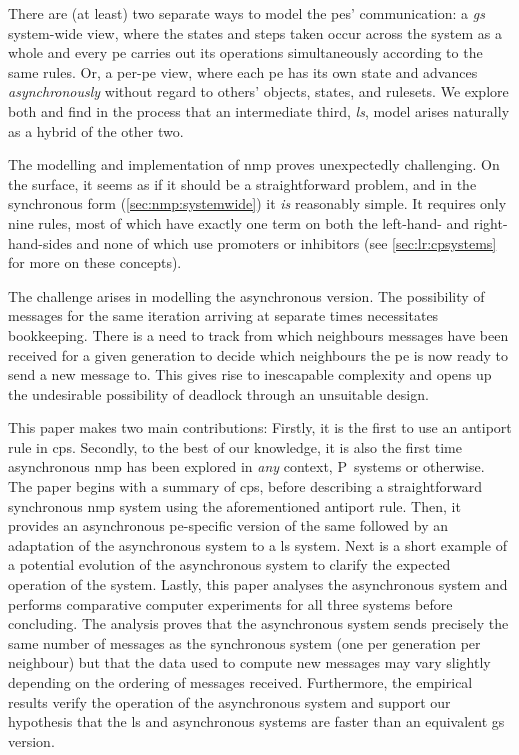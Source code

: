 There are (at least) two separate ways to model the \glspl{pe}' communication:  a \emph{\gls{gs}} system-wide view, where the states and steps taken occur across the system as a whole and every \gls{pe} carries out its operations simultaneously according to the same rules.  Or, a per-\gls{pe} view, where each \gls{pe} has its own state and advances \emph{asynchronously} without regard to others' objects, states, and rulesets.  We explore both and find in the process that an intermediate third, \emph{\gls{ls}}, model arises naturally as a hybrid of the other two.

The modelling and implementation of \gls{nmp} proves unexpectedly challenging.  On the surface, it seems as if it should be a straightforward problem, and in the synchronous form (\autoref{sec:nmp:systemwide}) it \emph{is} reasonably simple.  It requires only nine rules, most of which have exactly one term on both the left-hand- and right-hand-sides and none of which use promoters or inhibitors (see \autoref{sec:lr:cpsystems} for more on these concepts).

The challenge arises in modelling the asynchronous version.  The possibility of messages for the same iteration arriving at separate times necessitates bookkeeping.  There is a need to track from which neighbours messages have been received for a given generation to decide which neighbours the \gls{pe} is now ready to send a new message to.  This gives rise to inescapable complexity and opens up the undesirable possibility of deadlock through an unsuitable design.

This paper makes two main contributions:  Firstly, it is the first to use an antiport rule in \gls{cps}.  Secondly, to the best of our knowledge, it is also the first time asynchronous \gls{nmp} has been explored in \emph{any} context, P~systems or otherwise.  The paper begins with a summary of \gls{cps}, before describing a straightforward synchronous \gls{nmp} system using the aforementioned antiport rule.  Then, it provides an asynchronous \gls{pe}-specific version of the same followed by an adaptation of the asynchronous system to a \gls{ls} system. Next is a short example of a potential evolution of the asynchronous system to clarify the expected operation of the system.  Lastly, this paper analyses the asynchronous system and performs comparative computer experiments for all three systems before concluding.  The analysis proves that the asynchronous system sends precisely the same number of messages as the synchronous system (one per generation per neighbour) but that the data used to compute new messages may vary slightly depending on the ordering of messages received.  Furthermore, the empirical results verify the operation of the asynchronous system and support our hypothesis that the \gls{ls} and asynchronous systems are faster than an equivalent \gls{gs} version.